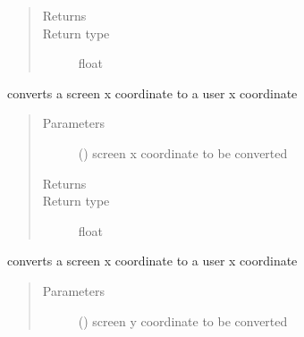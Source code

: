 \documentclass[letterpaper,10pt,english]{sphinxmanual}
\begin{document}
\begin{fulllineitems}
\begin{fulllineitems}
\begin{quote}
\begin{description}
\item[{Returns}] \leavevmode
{}

\item[{Return type}] \leavevmode
float

\end{description}\end{quote}

\end{fulllineitems}


\begin{fulllineitems}
\label{\detokenize{Reference:salabim.Environment.screen_to_usercoordinates_x}}
converts a screen x coordinate to a user x coordinate
\begin{quote}\begin{description}
\item[{Parameters}] \leavevmode
{} () \textendash{} screen x coordinate to be converted

\item[{Returns}] \leavevmode
{}

\item[{Return type}] \leavevmode
float

\end{description}\end{quote}

\end{fulllineitems}


\begin{fulllineitems}
\label{\detokenize{Reference:salabim.Environment.screen_to_usercoordinates_y}}
converts a screen x coordinate to a user x coordinate
\begin{quote}\begin{description}
\item[{Parameters}] \leavevmode
{} () \textendash{} screen y coordinate to be converted


\end{description}
\end{quote}
\end{fulllineitems}
\end{fulllineitems}
\end{document}
